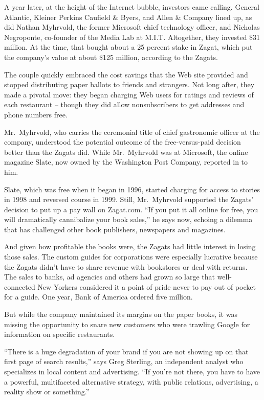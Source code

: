 ﻿\documentclass[12pt]{article}
\begin{document}
A year later, at the height of the Internet bubble, investors came calling. General Atlantic,
Kleiner Perkins Caufield \& Byers, and Allen \& Company lined up, as did Nathan Myhrvold, the former
Microsoft chief technology officer, and Nicholas Negroponte, co-founder of the Media Lab at M.I.T.
Altogether, they invested \$31 million. At the time, that bought about a 25 percent stake in Zagat,
which put the company's value at about \$125 million, according to the Zagats.

The couple quickly embraced the cost savings that the Web site provided and stopped distributing
paper ballots to friends and strangers. Not long after, they made a pivotal move: they began
charging Web users for ratings and reviews of each restaurant -- though they did allow
nonsubscribers to get addresses and phone numbers free.

Mr.~Myhrvold, who carries the ceremonial title of chief gastronomic officer at the company,
understood the potential outcome of the free-versus-paid decision better than the Zagats did. While
Mr.~Myhrvold was at Microsoft, the online magazine Slate, now owned by the Washington Post Company,
reported in to him.

Slate, which was free when it began in 1996, started charging for access to stories in 1998 and
reversed course in 1999. Still, Mr.~Myhrvold supported the Zagats' decision to put up a pay wall on
Zagat.com. ``If you put it all online for free, you will dramatically cannibalize your book sales,''
he says now, echoing a dilemma that has challenged other book publishers, newspapers and magazines.

And given how profitable the books were, the Zagats had little interest in losing those sales. The
custom guides for corporations were especially lucrative because the Zagats didn't have to share
revenue with bookstores or deal with returns. The sales to banks, ad agencies and others had grown
so large that well-connected New Yorkers considered it a point of pride never to pay out of pocket
for a guide. One year, Bank of America ordered five million.

But while the company maintained its margins on the paper books, it was missing the opportunity to
snare new customers who were trawling Google for information on specific restaurants.

``There is a huge degradation of your brand if you are not showing up on that first page of search
results,'' says Greg Sterling, an independent analyst who specializes in local content and
advertising. ``If you're not there, you have to have a powerful, multifaceted alternative strategy,
with public relations, advertising, a reality show or something.''
\end{document}
